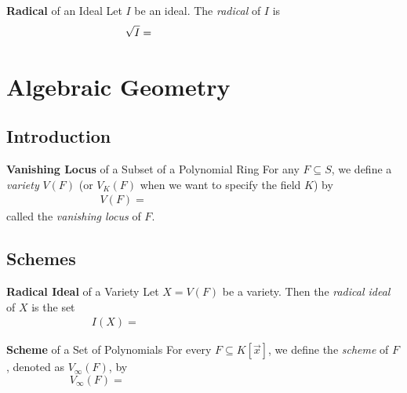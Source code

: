 \documentclass[11pt]{article}
\begin{document}
    \begin{definition}{\textbf{Radical} of an Ideal}
        Let $I$ be an ideal. The \emph{radical} of $I$ is
        \begin{equation*}
            \sqrt{I} = \phantom{\left\lbrace f\in S: \exists k\in\N\left[ f^k\in I \right] \right\rbrace}
        \end{equation*}
    \end{definition}

    \section{Algebraic Geometry}

    \subsection{Introduction}

    \begin{definition}{\textbf{Vanishing Locus} of a Subset of a Polynomial Ring}
        For any $F\subseteq S$, we define a \emph{variety} $V\left( F \right)$ (or $V_K\left( F \right)$ when we want to specify the field $K$) by
        \begin{equation*}
            V\left( F \right) = \phantom{\left\lbrace \vec{p}\in K^n: \forall f\in F\left[ f\left( \vec{p} \right) = 0 \right] \right\rbrace}
        \end{equation*}
        called the \emph{vanishing locus} of $F$.
    \end{definition}
    
    \subsection{Schemes}
    
    \begin{definition}{\textbf{Radical Ideal} of a Variety}
        Let $X = V\left( F \right)$ be a variety. Then the \emph{radical ideal} of $X$ is the set
        \begin{equation*}
            I\left( X \right) = \phantom{\left\lbrace f\in K\left[ \vec{x} \right] : \forall x\in X\left[ f\left( x \right)=0 \right] \right\rbrace}
        \end{equation*}
    \end{definition}

    \begin{definition}{\textbf{Scheme} of a Set of Polynomials}
        For every $F\subseteq K\left[ \vec{x} \right]$, we define the \emph{scheme} of $F$, denoted as $V_{\infty}\left( F \right)$, by
        \begin{equation*}
            V_{\infty}\left( F \right) = \phantom{\left\lbrace V_R\left( F \right) : \text{$R\supseteq K$ is a ring extension of $K$} \right\rbrace}
        \end{equation*}
    \end{definition}
\end{document}
